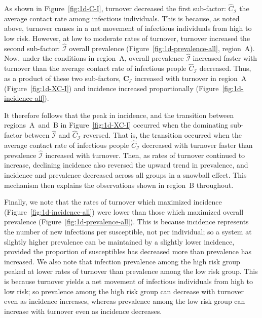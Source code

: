 \par
As shown in Figure~\ref{fig:1d-C-I}, turnover decreased the first sub-factor:
$\hat{C}_{\mathcal{I}}$ the average contact rate among infectious individuals.
This is because, as noted above,
turnover causes in a net movement of infectious individuals from high to low risk.
However, at low to moderate rates of turnover, turnover increased the second sub-factor:
$\hat{\mathcal{I}}$ overall prevalence
(Figure~\ref{fig:1d-prevalence-all}, region~A).
Now, under the conditions in region~A,
overall prevalence $\hat{\mathcal{I}}$
increased faster with turnover than
the average contact rate of infectious people $\hat{C}_{\mathcal{I}}$ decreased.
Thus, as a product of these two sub-factors,
$\bm{C}_{\mathcal{I}}$ increased with turnover in region~A
(Figure~\ref{fig:1d-XC-I})
and incidence increased proportionally
(Figure~\ref{fig:1d-incidence-all}).
\par
It therefore follows that the peak in incidence, and
the transition between regions~A~and~B in Figure~\ref{fig:1d-XC-I}
occurred when the dominating sub-factor
between $\hat{\mathcal{I}}$ and $\hat{C}_{\mathcal{I}}$ reversed.
That is, the transition occurred when
the average contact rate of infectious people $\hat{C}_{\mathcal{I}}$
decreased with turnover faster than prevalence $\hat{\mathcal{I}}$
increased with turnover.
Then, as rates of turnover continued to increase,
declining incidence also reversed the upward trend in prevalence,
and incidence and prevalence decreased across all groups in a snowball effect.
This mechanism then explains the observations shown in region~B throughout.
\par
Finally, we note that the rates of turnover which maximized incidence
(Figure~\ref{fig:1d-incidence-all})
were lower than those which maximized overall prevalence
(Figure~\ref{fig:1d-prevalence-all}).
This is because incidence represents
the number of new infections per susceptible, not per individual;
so a system at slightly higher prevalence
can be maintained by a slightly lower incidence,
provided the proportion of susceptibles has decreased more than
prevalence has increased.
We also note that infection prevalence among the high risk group
peaked at lower rates of turnover than prevalence among the low risk group.
This is because turnover yields a net movement of infectious individuals
from high to low risk;
so prevalence among the high risk group can decrease with turnover
even as incidence increases,
whereas prevalence among the low risk group can increase with turnover
even as incidence decreases.
